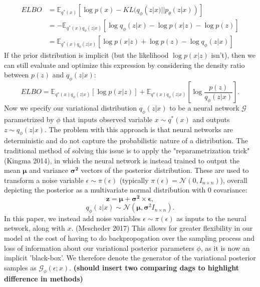 \documentclass[a4paper,12pt]{article}
\numberwithin{equation}{section}
\begin{document}
\begin{align*}
ELBO&=\mathbb{E}_{q^*(x)}[\log p(x)-KL(q_\phi(z|x)||p_\theta(z|x))]\\
&=-\mathbb{E}_{q^*(x)q_\phi(z|x)}\left[\log q_\phi(z|x)-\log p(x|z)-\log p(z)\right]\\
&=\mathbb{E}_{q^*(x)q_\phi(z|x)}\left[\log p(x|z)+\log p(z)-\log q_\phi(z|x)\right]
\end{align*}
If the prior distribution is implicit (but the likelihood $\log p(x|z)$ isn't), then we can still evaluate and optimize this expression by considering the density ratio between $p(z)$ and $q_\phi (z|x)$:
\[ELBO = \mathbb{E}_{q^*(x)q_\phi(z|x)}\left[\log p(x|z)\right]+\mathbb{E}_{q^*(x)q_\phi(z|x)}\left[\log \frac{p(z)}{q_\phi(z|x)}\right].\]
Now we specify our variational distribution $q_\phi(z|x)$ to be a neural network $\mathcal{G}$ parametrized by $\phi$ that inputs observed variable $x\sim q^*(x)$ and outputs $z\sim q_\phi(z|x)$.
The problem with this approach is that neural networks are deterministic and do not capture the probabilistic nature of a distribution. The traditional method of solving this issue is to apply the "reparametrization trick" (Kingma 2014), in which the neural network is instead trained to output the mean $\bm{\mu}$ and variance $\bm{\sigma^2}$ vectors of the posterior distribution. These are used to transform a noise variable $\epsilon \sim \pi(\epsilon)$ (typically $\pi(\epsilon) = \mathcal{N}(0,I_{n\times n})$), overall depicting the posterior as a multivariate normal distribution with 0 covariance:
\[\bm{z}=\bm{\mu}+\bm{\sigma^2}\times \bm{\epsilon},\]
\[q_\phi(z|x)\sim \mathcal{N}(\bm{\mu},\bm{\sigma}^2I_{n\times n}).\]
In this paper, we instead add noise variables $\epsilon \sim \pi(\epsilon)$ as inputs to the neural network, along with $x$. (Mescheder 2017) This allows for greater flexibility in our model at the cost of having to do backpropogation over the sampling process and loss of information about our variational posterior parameters $\phi$, as it is now an implicit 'black-box'. We therefore denote the generator of the variational posterior samples as $\mathcal{G}_\phi(\epsilon;x)$. \textbf{(should insert two comparing dags to highlight difference in methods)} \\
\end{document}
